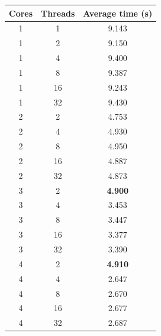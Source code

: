 \documentclass[bsc,frontabs,singlespacing,parskip,deptreport]{infthesis}
\begin{document}
\begin{table}[h]
\begin{minipage}{.3\textwidth}
\vfill
\centering
\scriptsize
\begin{tabular}{ccc}\toprule
Cores & Threads & Average time (s) \\
\midrule
1 &1 &9.143 \\
\midrule
1 &2 &9.150 \\
1 &4 &9.400 \\
1 &8 &9.387 \\
1 &16 &9.243 \\
1 &32 &9.430 \\
\midrule
2 &2 &4.753 \\
2 &4 &4.930 \\
2 &8 &4.950 \\
2 &16 &4.887 \\
2 &32 &4.873 \\
\midrule
3 &2 &\textbf{4.900} \\
3 &4 &3.453 \\
3 &8 &3.447 \\
3 &16 &3.377 \\
3 &32 &3.390 \\
\midrule
4 &2 &\textbf{4.910} \\
4 &4 &2.647 \\
4 &8 &2.670 \\
4 &16 &2.677 \\
4 &32 &2.687 \\
\bottomrule
\end{tabular}
\label{timing-infos-mb}
\end{minipage}\hfill\hfill
\begin{minipage}{0.65\textwidth}
\centering
    

\end{minipage}
\end{table}
\end{document}
